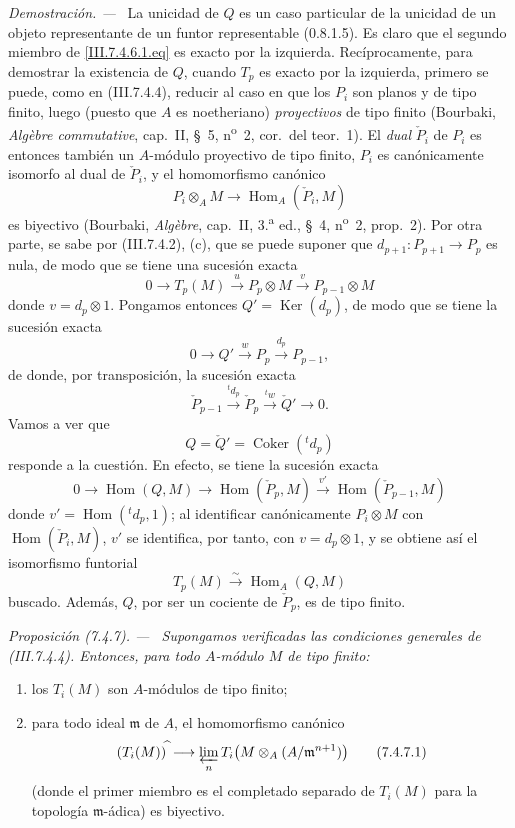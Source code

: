 \documentclass[10pt,oneside]{book}
\newcommand{\Hom}{\operatorname{Hom}}
\newcommand{\Ker}{\operatorname{Ker}}
\newcommand{\Coker}{\operatorname{Coker}}
\newcommand{\sref}[2][]{\textup{(#2)}}
\newcommand{\oldpage}[2][]{\setcounter{footnote}{0}\marginpar{\scriptsize\textbf{#1}~|~#2}\ignorespaces}
\newenvironment{proposition}[1][]{\par\medskip\noindent\itshape Proposición (#1). ---\ }{\par}
\newenvironment{proof}{\par\medskip\noindent\textit{Demostración. ---\ }}{\par}
\begin{document}
\begin{proof}
La unicidad de $Q$ es un caso particular de la unicidad de un objeto
representante de un funtor representable \sref[0]{0.8.1.5}. Es claro que el
segundo miembro de \eqref{III.7.4.6.1.eq} es exacto por la izquierda.
Recíprocamente, para demostrar la existencia de $Q$, cuando $T_p$ es exacto
por la izquierda, primero se puede, como en \sref{III.7.4.4}, reducir al caso
en que los $P_i$ son planos y de tipo finito, luego (puesto que $A$ es
noetheriano) \emph{proyectivos} de tipo finito (Bourbaki,
\emph{Algèbre commutative}, cap.~II, \S~5, n\textsuperscript{o}~2, cor.~del
teor.~1). El \emph{dual} $\check P_i$ de $P_i$ es entonces también un $A$-módulo
proyectivo de tipo finito, $P_i$ es canónicamente isomorfo al dual de
$\check P_i$, y el homomorfismo canónico
\[
  P_i\otimes_A M\longrightarrow\Hom_A(\check P_i,M)
\]
es biyectivo (Bourbaki, \emph{Algèbre}, cap.~II, 3.\textsuperscript{a} ed.,
\S~4, n\textsuperscript{o}~2, prop.~2). Por otra parte, se sabe por
\sref{III.7.4.2}, (c), que se puede suponer que
$d_{p+1}:P_{p+1}\to P_p$ es nula, de modo que se tiene una sucesión exacta
\[
  0\longrightarrow T_p(M)\xrightarrow{u}P_p\otimes M
  \xrightarrow{v}P_{p-1}\otimes M
\]
donde $v=d_p\otimes1$. Pongamos entonces $Q'=\Ker(d_p)$, de modo que se tiene
la sucesión exacta
\[
  0\longrightarrow Q'\xrightarrow{w}P_p\xrightarrow{d_p}P_{p-1},
\]
de donde, por transposición, la sucesión exacta
\[
  \check P_{p-1}\xrightarrow{{}^t d_p}\check P_p
  \xrightarrow{{}^t w}\check Q'\longrightarrow0.
\]
Vamos a ver que
\[
  Q=\check Q'=\Coker({}^t d_p)
\]
responde a la cuestión. En efecto, se tiene la sucesión exacta
\[
  0\longrightarrow\Hom(Q,M)
  \longrightarrow\Hom(\check P_p,M)
  \xrightarrow{v'}\Hom(\check P_{p-1},M)
\]
\oldpage[III]{189}
donde $v'=\Hom({}^t d_p,1)$; al identificar canónicamente
$P_i\otimes M$ con $\Hom(\check P_i,M)$, $v'$ se identifica, por tanto, con
$v=d_p\otimes1$, y se obtiene así el isomorfismo funtorial
\[
  T_p(M)\xrightarrow{\sim}\Hom_A(Q,M)
\]
buscado. Además, $Q$, por ser un cociente de $\check P_p$, es de tipo finito.
\end{proof}

\begin{proposition}[7.4.7]
\label{III.7.4.7}
Supongamos verificadas las condiciones generales de \sref{III.7.4.4}. Entonces,
para todo $A$-módulo $M$ de tipo finito:
\begin{enumerate}
  \item[\textup{(i)}] los $T_i(M)$ son $A$-módulos de tipo finito;
  \item[\textup{(ii)}] para todo ideal $\mathfrak m$ de $A$, el homomorfismo canónico
    \[
      (T_i(M))^{\widehat{\,}}
      \longrightarrow
      \varprojlim_n T_i\bigl(M\otimes_A(A/\mathfrak m^{n+1})\bigr)
      \tag{7.4.7.1}\label{III.7.4.7.1.eq}
    \]
    (donde el primer miembro es el completado separado de $T_i(M)$ para la
    topología $\mathfrak m$-ádica) es biyectivo.
\end{enumerate}
\end{proposition}
\end{document}
